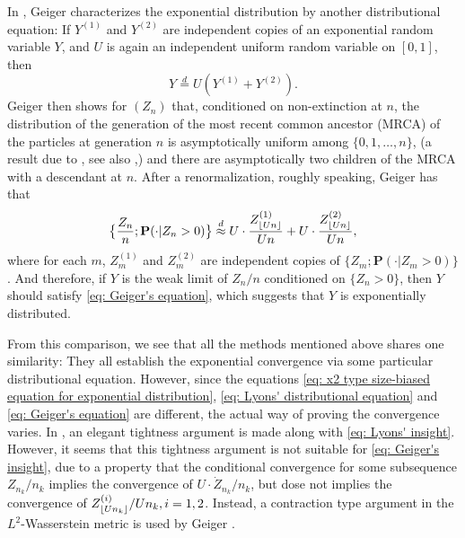 \documentclass[12pt,a4paper]{amsart}
\DeclarePairedDelimiter\floor{\lfloor}{\rfloor}
\numberwithin{equation}{section}
\begin{document}
	In \cite{geiger2000new}, Geiger characterizes the exponential distribution by another distributional equation: 
	If $Y^{(1)}$ and $Y^{(2)}$ are independent copies of an exponential random variable $Y$, and $U$ is again an independent uniform random variable on $[0,1]$, then 
\begin{equation}
\label{eq: Geiger's equation}
	Y	\overset{d} = U (Y^{(1)} + Y^{(2)}).
\end{equation}
	Geiger then shows for $(Z_n)$ that, conditioned on non-extinction at $n$, the distribution of the generation of the most recent common ancestor (MRCA) of the particles at generation $n$ is asymptotically uniform among $\{0,1,\dots,n\}$, (a result due to \cite{Zubkov1975}, see also \cite{geiger1999elementary},) and there are asymptotically two children of the MRCA with a descendant at $n$. 
	After a renormalization, roughly speaking, Geiger has that 
\begin{equation}
\label{eq: Geiger's insight}
	\big\{\frac{Z_n}{n} ; \mathbf P(  \cdot| Z_n > 0) \big\} 
	\overset{d}{\approx} U \cdot \frac{ Z^{(1)}_{  \floor{Un}  }}{Un} + U \cdot \frac{ Z^{(2)}_{ \floor{Un} }}{Un} ,
\end{equation}
	where for each $m$, $Z_m^{(1)}$ and $Z_m^{(2)}$ are independent copies of $\{Z_m; \mathbf P(\cdot | Z_m > 0)\}$.
	And therefore, if $Y$ is the weak limit of $Z_n/n$ conditioned on $\{Z_n > 0\}$, then $Y$ should satisfy \eqref{eq: Geiger's equation}, which suggests that $Y$ is exponentially distributed. 
	
	From this comparison, we see that all the methods mentioned above shares one similarity: They all establish the exponential convergence via some particular distributional equation. 
	However, since the equations \eqref{eq: x2 type size-biased equation for exponential distribution}, \eqref{eq: Lyons' distributional equation} and \eqref{eq: Geiger's equation} are different, the actual way of proving the convergence varies.
	In \cite{lyons1995conceptual}, an elegant tightness argument is made along with \eqref{eq: Lyons' insight}. 
	However, it seems that this tightness argument is not suitable for \eqref{eq: Geiger's insight}, due to a property that the conditional convergence for some subsequence $Z_{n_k}/n_k$ implies the convergence of $U \cdot \dot Z_{n_k}/n_k$, %
	but dose not implies the convergence of $Z^{(i)}_{ \floor{Un_k}}/Un_k, i=1, 2$. 
	Instead, a contraction type argument in the $L^2$-Wasserstein metric is used by Geiger \cite{geiger2000new}.
	
\end{document}

